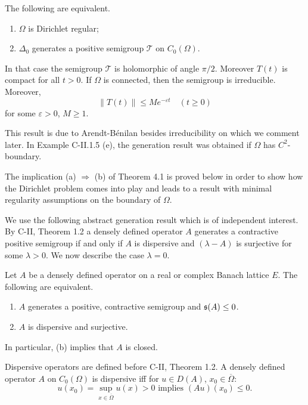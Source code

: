 \begin{theorem} %
The following are equivalent.

\begin{enumerate}[\upshape (a)]
\item 
$\Omega$ is Dirichlet regular;

\item  
$\Delta_0$ generates a positive semigroup $\mathcal{T}$ on $C_0(\Omega)$.

\end{enumerate}
In that case the semigroup $\mathcal{T}$ is holomorphic of angle $\pi/2$. 
Moreover $T(t)$ is compact for all $t > 0$.
If $\Omega$ is connected, then the semigroup is irreducible. 
Moreover,
\begin{equation}
\|T(t)\| \leq Me^{-\varepsilon t} \quad (t \geq 0)
\end{equation}
for some $\varepsilon > 0$, $M \geq 1$.
\end{theorem}
This result is due to Arendt-Bénilan \cite{ArBe99} besides irreducibility on which we comment later.
In Example C-II.1.5 (e), the generation result was obtained if $\Omega$ has $C^2$-boundary.

The implication (a) $\Rightarrow$ (b) of Theorem 4.1 is proved below in order to show how the Dirichlet problem comes into play and leads to a result with minimal regularity assumptions on the boundary of $\Omega$.

We use the following abstract generation result which is of independent interest. 
By C-II, Theorem 1.2 a densely defined operator $A$ generates a contractive positive semigroup if and only if $A$ is dispersive and $(\lambda - A)$ is surjective for some $\lambda > 0$.
We now describe the case $\lambda = 0$.
\begin{theorem}
Let $A$ be a densely defined operator on a real or complex Banach lattice $E$. 
The following are equivalent.
\begin{enumerate}[\upshape (a)]
\item  
$A$ generates a positive, contractive semigroup and $\mathfrak{s}(A) \leq 0$.
\item  
$A$ is dispersive and surjective.
\end{enumerate}
In particular, (b) implies that $A$ is closed.
\end{theorem}
Dispersive operators are defined before C-II, Theorem 1.2. A densely defined operator $A$ on $C_0(\Omega)$ is dispersive iff for $u \in D(A)$, $x_0 \in \overline{\Omega}$:
\[u(x_0) = \sup_{x \in \overline{\Omega}} u(x) > 0 \text{ implies } (Au)(x_0) \leq 0.\]

